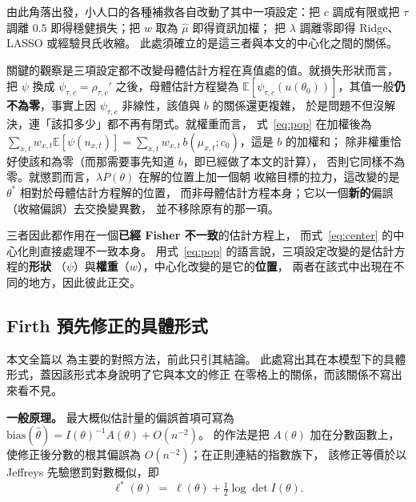 \documentclass[UTF8, fontset=macnew, a4paper, 12pt]{ctexart}
\newcommand{\Ex}{\mathbb{E}}
\begin{document}
由此角落出發，小人口的各種補救各自改動了其中一項設定：把 $c$ 調成有限或把
$\tau$ 調離 $0.5$ 即得穩健損失；把 $w$ 取為 $\hat\mu$ 即得資訊加權；
把 $\lambda$ 調離零即得 Ridge、LASSO 或經驗貝氏收縮。
此處須確立的是這三者與本文的中心化之間的關係。

關鍵的觀察是三項設定都不改變母體估計方程在真值處的值。就損失形狀而言，
把 $\psi$ 換成 $\psi_{\tau,c}=\rho_{\tau,c}'$ 之後，母體估計方程變為
$\Ex[\psi_{\tau,c}(u(\theta_0))]$，其值一般\textbf{仍不為零}，事實上因 $\psi_{\tau,c}$ 非線性，該值與 $b$ 的關係還更複雜，
於是問題不但沒解決，連「該扣多少」都不再有閉式。就權重而言，
式~\eqref{eq:pop} 在加權後為 $\sum_{x,t}w_{x,t}\Ex[\psi(u_{x,t})]=
\sum_{x,t}w_{x,t}\,b(\mu_{x,t};c_0)$，這是 $b$ 的加權和；
除非權重恰好使該和為零（而那需要事先知道 $b$，即已經做了本文的計算），
否則它同樣不為零。就懲罰而言，$\lambda P(\theta)$ 在解的位置上加一個朝
收縮目標的拉力，這改變的是 $\theta^{\ast}$ 相對於母體估計方程解的位置，
而非母體估計方程本身；它以一個\textbf{新的}偏誤（收縮偏誤）去交換變異數，
並不移除原有的那一項。

三者因此都作用在一個\textbf{已經 Fisher 不一致}的估計方程上，
而式~\eqref{eq:center} 的中心化則直接處理不一致本身。
用式~\eqref{eq:pop} 的語言說，三項設定改變的是估計方程的\textbf{形狀}
（$\psi$）與\textbf{權重}（$w$），中心化改變的是它的\textbf{位置}，
兩者在該式中出現在不同的地方，因此彼此正交。

\subsection{Firth 預先修正的具體形式}\label{subsec:firthmath}

本文全篇以 \citet{firth1993} 為主要的對照方法，前此只引其結論。
此處寫出其在本模型下的具體形式，蓋因該形式本身說明了它與本文的修正
在零格上的關係，而該關係不寫出來看不見。

\textbf{一般原理。} 最大概似估計量的偏誤首項可寫為
$\mathrm{bias}(\hat\theta)=I(\theta)^{-1}A(\theta)+O(n^{-2})$。
\citet{firth1993} 的作法是把 $A(\theta)$ 加在分數函數上，
使修正後分數的根其偏誤為 $O(n^{-2})$；在正則連結的指數族下，
該修正等價於以 Jeffreys 先驗懲罰對數概似，即
\begin{equation}\label{eq:jeffreys}
\ell^{*}(\theta)\;=\;\ell(\theta)+\tfrac12\log\det I(\theta).
\end{equation}
\end{document}
